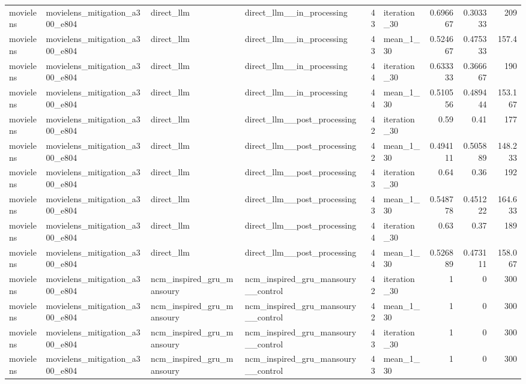 \begin{table}[htbp!]
\begin{tabular}{llllrlrrr}
movielens & movielens\_mitigation\_a300\_e804 & direct\_llm & direct\_llm\_\_in\_processing & 43 & iteration\_30 & 0.696667 & 0.303333 & 209 \\
movielens & movielens\_mitigation\_a300\_e804 & direct\_llm & direct\_llm\_\_in\_processing & 43 & mean\_1\_30 & 0.524667 & 0.475333 & 157.4 \\
movielens & movielens\_mitigation\_a300\_e804 & direct\_llm & direct\_llm\_\_in\_processing & 44 & iteration\_30 & 0.633333 & 0.366667 & 190 \\
movielens & movielens\_mitigation\_a300\_e804 & direct\_llm & direct\_llm\_\_in\_processing & 44 & mean\_1\_30 & 0.510556 & 0.489444 & 153.167 \\
movielens & movielens\_mitigation\_a300\_e804 & direct\_llm & direct\_llm\_\_post\_processing & 42 & iteration\_30 & 0.59 & 0.41 & 177 \\
movielens & movielens\_mitigation\_a300\_e804 & direct\_llm & direct\_llm\_\_post\_processing & 42 & mean\_1\_30 & 0.494111 & 0.505889 & 148.233 \\
movielens & movielens\_mitigation\_a300\_e804 & direct\_llm & direct\_llm\_\_post\_processing & 43 & iteration\_30 & 0.64 & 0.36 & 192 \\
movielens & movielens\_mitigation\_a300\_e804 & direct\_llm & direct\_llm\_\_post\_processing & 43 & mean\_1\_30 & 0.548778 & 0.451222 & 164.633 \\
movielens & movielens\_mitigation\_a300\_e804 & direct\_llm & direct\_llm\_\_post\_processing & 44 & iteration\_30 & 0.63 & 0.37 & 189 \\
movielens & movielens\_mitigation\_a300\_e804 & direct\_llm & direct\_llm\_\_post\_processing & 44 & mean\_1\_30 & 0.526889 & 0.473111 & 158.067 \\
movielens & movielens\_mitigation\_a300\_e804 & ncm\_inspired\_gru\_mansoury & ncm\_inspired\_gru\_mansoury\_\_control & 42 & iteration\_30 & 1 & 0 & 300 \\
movielens & movielens\_mitigation\_a300\_e804 & ncm\_inspired\_gru\_mansoury & ncm\_inspired\_gru\_mansoury\_\_control & 42 & mean\_1\_30 & 1 & 0 & 300 \\
movielens & movielens\_mitigation\_a300\_e804 & ncm\_inspired\_gru\_mansoury & ncm\_inspired\_gru\_mansoury\_\_control & 43 & iteration\_30 & 1 & 0 & 300 \\
movielens & movielens\_mitigation\_a300\_e804 & ncm\_inspired\_gru\_mansoury & ncm\_inspired\_gru\_mansoury\_\_control & 43 & mean\_1\_30 & 1 & 0 & 300 \\

\end{tabular}
\end{table}
